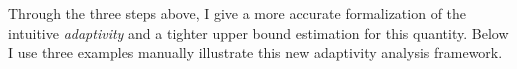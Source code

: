 Through the three steps above, I give a more accurate formalization of the intuitive \emph{adaptivity} and
a tighter upper bound estimation for this quantity.
Below I use three examples manually illustrate this new adaptivity analysis framework. 
% 
% 



